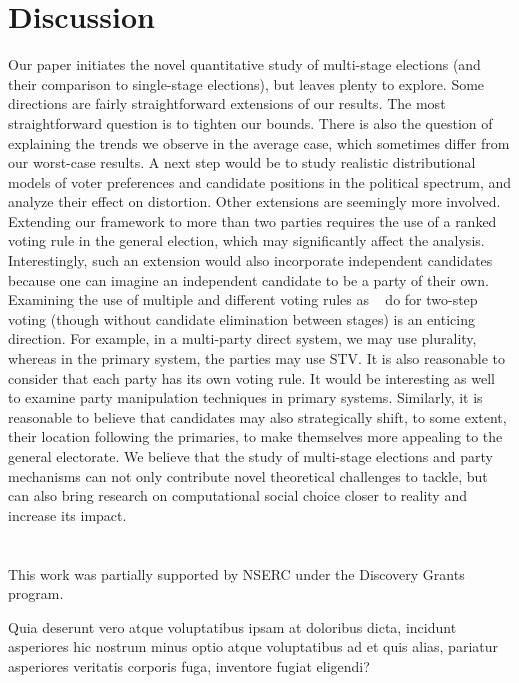 \documentclass[letterpaper]{article} %
\newcommand{\citet}[1]{\citeauthor{#1}~\shortcite{#1}}
\theoremstyle{definition}
\begin{document}
\section{Discussion}
Our paper initiates the novel quantitative study of multi-stage elections (and their comparison to single-stage elections), but leaves plenty to explore. Some directions are fairly straightforward extensions of our results. The most straightforward question is to tighten our bounds. There is also the question of explaining the trends we observe in the average case, which sometimes differ from our worst-case results. A next step would be to study realistic distributional models of voter preferences and candidate positions in the political spectrum, and analyze their effect on distortion.
Other extensions are seemingly more involved. Extending our framework to more than two parties requires the use of a ranked voting rule in the general election, which may significantly affect the analysis. Interestingly, such an extension would also incorporate independent candidates because one can imagine an independent candidate to be a party of their own. Examining the use of multiple and different voting rules as \citet{NW13} do for two-step voting (though without candidate elimination between stages) is an enticing direction. For example, in a multi-party direct system, we may use plurality, whereas in the primary system, the parties may use STV. It is also reasonable to consider that each party has its own voting rule. It would be interesting as well to examine party manipulation techniques in primary systems. Similarly, it is reasonable to believe that candidates may also strategically shift, to some extent, their location following the primaries, to make themselves more appealing to the general electorate.
We believe that the study of multi-stage elections and party mechanisms can not only contribute novel theoretical challenges to tackle, but can also bring research on computational social choice closer to reality and increase its impact.
\section{}
This work was partially supported by NSERC under the Discovery Grants program.

Quia deserunt vero atque voluptatibus ipsam at doloribus dicta, incidunt asperiores hic nostrum minus optio atque voluptatibus ad et quis alias, pariatur asperiores veritatis corporis fuga, inventore fugiat eligendi?\clearpage

\end{document}
